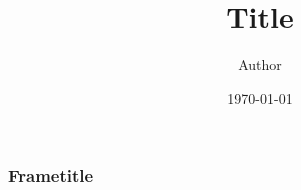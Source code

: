\documentclass{beamer}
\title{Title}
\author{Author}
\date{\today}
\institute{Institute}
\begin{document}
\begin{frame}
	\titlepage
\end{frame}

\begin{frame}
	\frametitle{Frametitle}
\end{frame}
\end{document}
